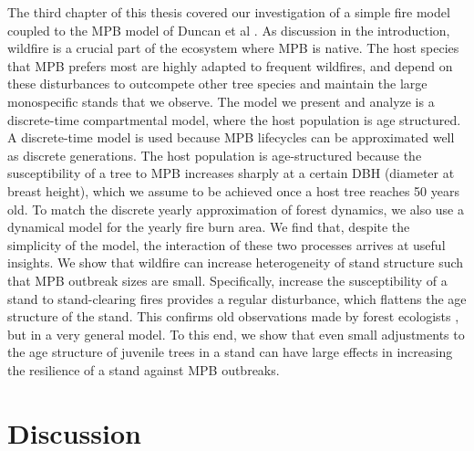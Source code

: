 The third chapter of this thesis covered our investigation of a simple fire model coupled to the MPB model of Duncan et al \cite{duncan2015model}. As discussion in the introduction, wildfire is a crucial part of the ecosystem where MPB is native. The host species that MPB prefers most are highly adapted to frequent wildfires, and depend on these disturbances to outcompete other tree species and maintain the large monospecific stands that we observe. The model we present and analyze is a discrete-time compartmental model, where the host population is age structured. A discrete-time model is used because MPB lifecycles can be approximated well as discrete generations. The host population is age-structured because the susceptibility of a tree to MPB increases sharply at a certain DBH (diameter at breast height), which we assume to be achieved once a host tree reaches 50 years old. To match the discrete yearly approximation of forest dynamics, we also use a dynamical model for the yearly fire burn area. We find that, despite the simplicity of the model, the interaction of these two processes arrives at useful insights. We show that wildfire can increase heterogeneity of stand structure such that MPB outbreak sizes are small. Specifically, increase the susceptibility of a stand to stand-clearing fires provides a regular disturbance, which flattens the age structure of the stand. This confirms old observations made by forest ecologists \cite{kaufmann2008status, seidl2016spatial}, but in a very general model. To this end, we show that even small adjustments to the age structure of juvenile trees in a stand can have large effects in increasing the resilience of a stand against MPB outbreaks.     


\section{Discussion}

